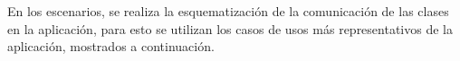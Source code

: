 \documentclass{memoria}
\begin{document}

\newpage
{}

En los escenarios, se realiza la esquematización de la comunicación de las clases en la aplicación, para esto se utilizan los casos de usos más representativos de la aplicación, mostrados a continuación.


\end{document}
